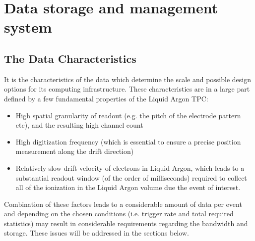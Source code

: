 \section{Data storage and management system}

\subsection{The \pd Data Characteristics}
It is the characteristics of the \pd data which determine the scale and possible design options for its computing infrastructure.
These characteristics are in a large part defined by a few fundamental properties of the \pd Liquid Argon TPC:
\begin{itemize}
\item High spatial granularity of readout (e.g. the pitch of the electrode pattern etc), and the resulting high channel count
\item High digitization frequency (which is essential to ensure a precise position measurement along the drift direction)
\item Relatively slow drift velocity of electrons in Liquid Argon, which  leads to a substantial readout window (of the order of milliseconds) required to collect
all of the ionization in the Liquid Argon volume due the event of interest. 
\end{itemize}

\noindent Combination of these factors leads to a considerable amount of data per event and depending on
the chosen conditions (i.e. trigger rate and total required statistics) may result in considerable requirements
regarding the bandwidth and storage. These issues will be addressed in the sections below.



